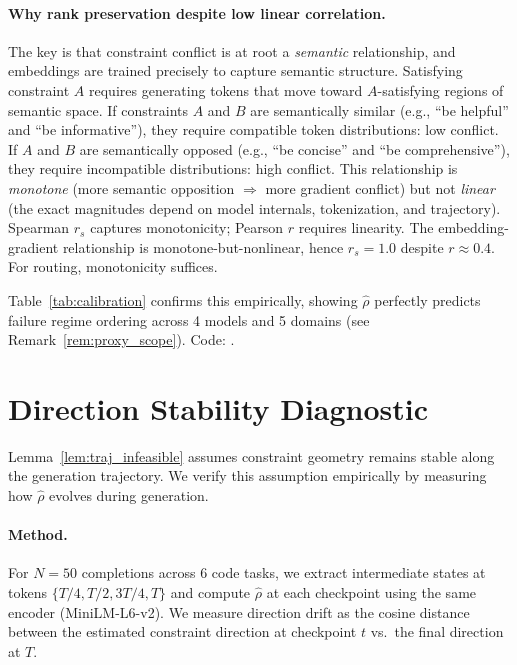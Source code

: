 \documentclass{article}
\theoremstyle{plain}
\theoremstyle{definition}
\theoremstyle{remark}
\newcommand{\rhohat}{\hat{\rho}}
\begin{document}
\paragraph{Why rank preservation despite low linear correlation.}
The key is that constraint conflict is at root a \emph{semantic} relationship, and embeddings are trained precisely to capture semantic structure. Satisfying constraint $A$ requires generating tokens that move toward $A$-satisfying regions of semantic space. If constraints $A$ and $B$ are semantically similar (e.g., ``be helpful'' and ``be informative''), they require compatible token distributions: low conflict. If $A$ and $B$ are semantically opposed (e.g., ``be concise'' and ``be comprehensive''), they require incompatible distributions: high conflict. This relationship is \emph{monotone} (more semantic opposition $\Rightarrow$ more gradient conflict) but not \emph{linear} (the exact magnitudes depend on model internals, tokenization, and trajectory). Spearman $r_s$ captures monotonicity; Pearson $r$ requires linearity. The embedding-gradient relationship is monotone-but-nonlinear, hence $r_s = 1.0$ despite $r \approx 0.4$. For routing, monotonicity suffices.

Table~\ref{tab:calibration} confirms this empirically, showing $\rhohat$ perfectly predicts failure regime ordering across 4 models and 5 domains (see Remark~\ref{rem:proxy_scope}). Code: .

\section{Direction Stability Diagnostic}\label{app:direction_stability}\hypertarget{lim:pivot}{}

Lemma~\ref{lem:traj_infeasible} assumes constraint geometry remains stable along the generation trajectory. We verify this assumption empirically by measuring how $\rhohat$ evolves during generation.

\paragraph{Method.}
For $N{=}50$ completions across 6 code tasks, we extract intermediate states at tokens $\{T/4, T/2, 3T/4, T\}$ and compute $\rhohat$ at each checkpoint using the same encoder (MiniLM-L6-v2). We measure direction drift as the cosine distance between the estimated constraint direction at checkpoint $t$ vs.\ the final direction at $T$.
\end{document}
